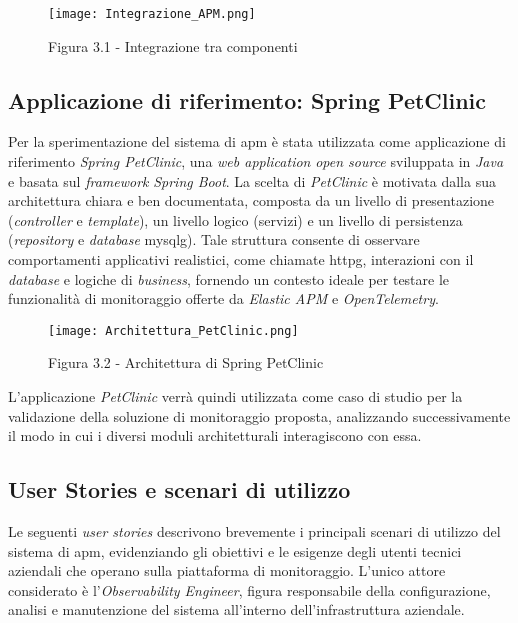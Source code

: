 \begin{figure}[!h] 
    \centering 
    \texttt{[image: Integrazione\_APM.png]} 
    \caption{Figura 3.1 - Integrazione tra componenti}
\end{figure}


\subsection{Applicazione di riferimento: Spring PetClinic}
Per la sperimentazione del sistema di \gls{apm} è stata utilizzata come applicazione di riferimento \emph{Spring PetClinic}, una \emph{web application} \emph{open source} sviluppata in \emph{Java} e basata sul \emph{framework} \emph{Spring Boot}.  
La scelta di \emph{PetClinic} è motivata dalla sua architettura chiara e ben documentata, composta da un livello di presentazione (\emph{controller} e \emph{template}), un livello logico (servizi) e un livello di persistenza (\emph{repository} e \emph{database} \gls{mysqlg}\glsfirstoccur).  
Tale struttura consente di osservare comportamenti applicativi realistici, come chiamate \gls{httpg}\glsfirstoccur, interazioni con il \emph{database} e logiche di \emph{business}, fornendo un contesto ideale per testare le funzionalità di monitoraggio offerte da \emph{Elastic APM} e \emph{OpenTelemetry}.  

\begin{figure}[!h] 
    \centering 
    \texttt{[image: Architettura\_PetClinic.png]} 
    \caption{Figura 3.2 - Architettura di Spring PetClinic}
\end{figure}


L'applicazione \emph{PetClinic} verrà quindi utilizzata come caso di studio per la validazione della soluzione di monitoraggio proposta, analizzando successivamente il modo in cui i diversi moduli architetturali interagiscono con essa.
\newpage

\subsection{User Stories e scenari di utilizzo}
Le seguenti \emph{user stories} descrivono brevemente i principali scenari di utilizzo del sistema di \gls{apm}, evidenziando gli obiettivi e le esigenze degli utenti tecnici aziendali che operano sulla piattaforma di monitoraggio.  
L'unico attore considerato è l'\emph{Observability Engineer}, figura responsabile della configurazione, analisi e manutenzione del sistema all'interno dell'infrastruttura aziendale.


